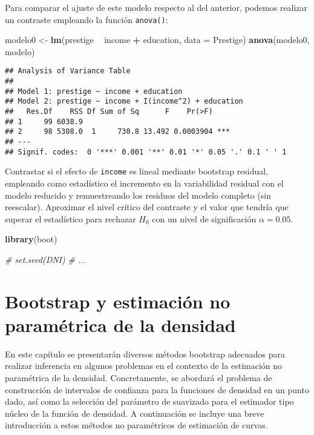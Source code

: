 \documentclass[]{book}
\newenvironment{Shaded}{\begin{snugshade}}{\end{snugshade}}
\newcommand{\KeywordTok}[1]{\textcolor[rgb]{0.13,0.29,0.53}{\textbf{#1}}}
\newcommand{\DataTypeTok}[1]{\textcolor[rgb]{0.13,0.29,0.53}{#1}}
\newcommand{\StringTok}[1]{\textcolor[rgb]{0.31,0.60,0.02}{#1}}
\newcommand{\CommentTok}[1]{\textcolor[rgb]{0.56,0.35,0.01}{\textit{#1}}}
\newcommand{\OperatorTok}[1]{\textcolor[rgb]{0.81,0.36,0.00}{\textbf{#1}}}
\newcommand{\NormalTok}[1]{#1}
\theoremstyle{break}
\theoremstyle{definition}
\theoremstyle{definition}
\theoremstyle{definition}
\theoremstyle{remark}
\begin{document}
Para comparar el ajuste de este modelo respecto al del anterior, podemos
realizar un contraste empleando la función \texttt{anova()}:

\begin{Shaded}
\begin{Highlighting}[]
\NormalTok{modelo0 <-}\StringTok{ }\KeywordTok{lm}\NormalTok{(prestige }\OperatorTok{~}\StringTok{ }\NormalTok{income }\OperatorTok{+}\StringTok{ }\NormalTok{education, }\DataTypeTok{data =}\NormalTok{ Prestige)}
\KeywordTok{anova}\NormalTok{(modelo0, modelo)}
\end{Highlighting}
\end{Shaded}

\begin{verbatim}
## Analysis of Variance Table
## 
## Model 1: prestige ~ income + education
## Model 2: prestige ~ income + I(income^2) + education
##   Res.Df    RSS Df Sum of Sq      F    Pr(>F)    
## 1     99 6038.9                                  
## 2     98 5308.0  1     730.8 13.492 0.0003904 ***
## ---
## Signif. codes:  0 '***' 0.001 '**' 0.01 '*' 0.05 '.' 0.1 ' ' 1
\end{verbatim}

Contrastar si el efecto de \texttt{income} es lineal mediante bootstrap
residual, empleando como estadístico el incremento en la variabilidad
residual con el modelo reducido y remuestreando los residuos del modelo
completo (sin reescalar). Aproximar el nivel crítico del contraste y el
valor que tendría que superar el estadístico para rechazar \(H_0\) con
un nivel de significación \(\alpha = 0.05\).

\begin{Shaded}
\begin{Highlighting}[]
\KeywordTok{library}\NormalTok{(boot)}

\CommentTok{# set.seed(DNI)}
\CommentTok{# ...}
\end{Highlighting}
\end{Shaded}

\chapter{Bootstrap y estimación no paramétrica de la
densidad}\label{npden}

En este capítulo se presentarán diversos métodos bootstrap adecuados
para realizar inferencia en algunos problemas en el contexto de la
estimación no paramétrica de la densidad. Concretamente, se abordará el
problema de construcción de intervalos de confianza para la funciones de
densidad en un punto dado, así como la selección del parámetro de
suavizado para el estimador tipo núcleo de la función de densidad. A
continuación se incluye una breve introducción a estos métodos no
paramétricos de estimación de curvas.
\end{document}
